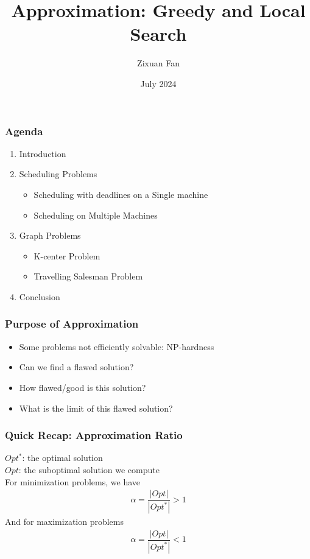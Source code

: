 \documentclass{beamer}
\title{Approximation: Greedy and Local Search}
\author{Zixuan Fan}
\institute{Technische Universität München}
\date{July 2024}
\begin{document}
\begin{frame}
    \titlepage   
\end{frame}

\begin{frame}
    \frametitle{Agenda}
    \begin{enumerate}
        \item Introduction
        \item Scheduling Problems
            \begin{itemize}
                \item Scheduling with deadlines on a Single machine
                \item Scheduling on Multiple Machines 
            \end{itemize}
        \item Graph Problems 
            \begin{itemize}
                \item K-center Problem 
                \item Travelling Salesman Problem
            \end{itemize}
        \item Conclusion
    \end{enumerate}
\end{frame}

\begin{frame}
    \frametitle{Purpose of Approximation}
    \begin{itemize}
        \item<1-> Some problems not efficiently solvable: NP-hardness
        \item<2-> Can we find a flawed solution?
        \item<3-> How flawed/good is this solution?
        \item<4-> What is the limit of this flawed solution?
    \end{itemize}
\end{frame}

\begin{frame}
    \frametitle{Quick Recap: Approximation Ratio}
    $Opt^*$: the optimal solution \\ 
    $Opt$: the suboptimal solution we compute \\[10pt]
    For minimization problems, we have
    \begin{align*}
        \alpha = \dfrac{|Opt|}{|Opt^*|} > 1
    \end{align*}
    And for maximization problems
    \begin{align*}
        \alpha = \dfrac{|Opt|}{|Opt^*|} < 1
    \end{align*}
\end{frame}
\end{document}
